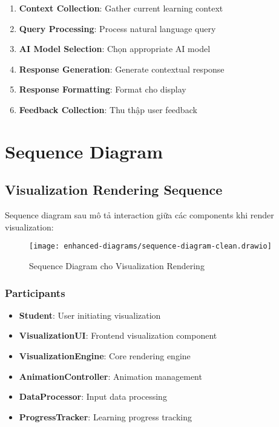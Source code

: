 \begin{enumerate}
    \item \textbf{Context Collection}: Gather current learning context
    \item \textbf{Query Processing}: Process natural language query
    \item \textbf{AI Model Selection}: Chọn appropriate AI model
    \item \textbf{Response Generation}: Generate contextual response
    \item \textbf{Response Formatting}: Format cho display
    \item \textbf{Feedback Collection}: Thu thập user feedback
\end{enumerate}

\section{Sequence Diagram}
\label{sec:sequence-diagram}

\subsection{Visualization Rendering Sequence}
\label{subsec:visualization-sequence}

Sequence diagram sau mô tả interaction giữa các components khi render visualization:

\begin{figure}[H]
\centering
\texttt{[image: enhanced-diagrams/sequence-diagram-clean.drawio]}
\caption{Sequence Diagram cho Visualization Rendering}
\label{fig:sequence-viz}
\end{figure}

\subsubsection{Participants}

\begin{itemize}
    \item \textbf{Student}: User initiating visualization
    \item \textbf{VisualizationUI}: Frontend visualization component
    \item \textbf{VisualizationEngine}: Core rendering engine
    \item \textbf{AnimationController}: Animation management
    \item \textbf{DataProcessor}: Input data processing
    \item \textbf{ProgressTracker}: Learning progress tracking
\end{itemize}

